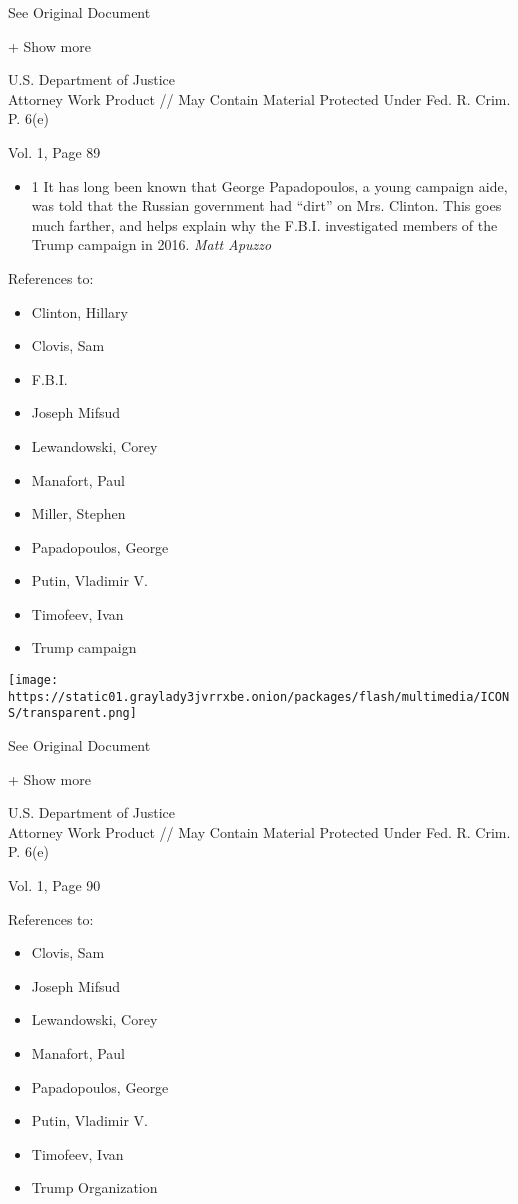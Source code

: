See Original Document

+ Show more

U.S. Department of Justice\\
Attorney Work Product // May Contain Material Protected Under Fed. R.
Crim. P. 6(e)

Vol. 1, Page 89

\begin{itemize}
\tightlist
\item
  1 It has long been known that George Papadopoulos, a young campaign
  aide, was told that the Russian government had ``dirt'' on Mrs.
  Clinton. This goes much farther, and helps explain why the F.B.I.
  investigated members of the Trump campaign in 2016. \emph{Matt Apuzzo}
\end{itemize}

References to:

\begin{itemize}
\tightlist
\item
  Clinton, Hillary
\item
  Clovis, Sam
\item
  F.B.I.
\item
  Joseph Mifsud
\item
  Lewandowski, Corey
\item
  Manafort, Paul 
\item
  Miller, Stephen
\item
  Papadopoulos, George
\item
  Putin, Vladimir V.
\item
  Timofeev, Ivan
\item
  Trump campaign
\end{itemize}

\protect\hyperlink{}{}

\texttt{[image: https://static01.graylady3jvrrxbe.onion/packages/flash/multimedia/ICONS/transparent.png]}

See Original Document

+ Show more

U.S. Department of Justice\\
Attorney Work Product // May Contain Material Protected Under Fed. R.
Crim. P. 6(e)

Vol. 1, Page 90

References to:

\begin{itemize}
\tightlist
\item
  Clovis, Sam
\item
  Joseph Mifsud
\item
  Lewandowski, Corey
\item
  Manafort, Paul 
\item
  Papadopoulos, George
\item
  Putin, Vladimir V.
\item
  Timofeev, Ivan
\item
  Trump Organization
\end{itemize}

